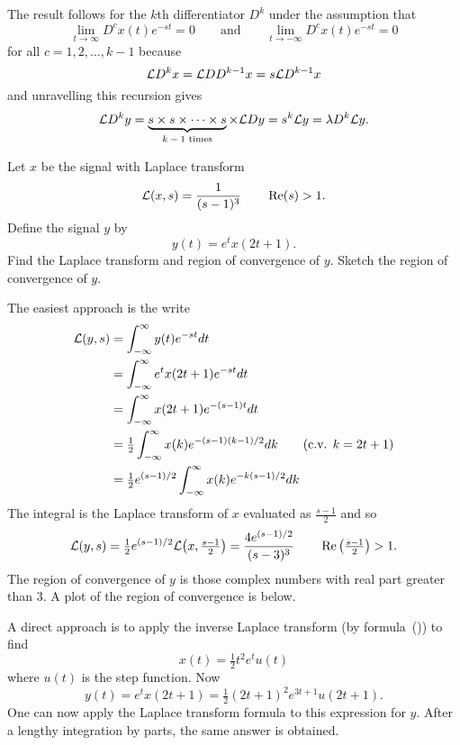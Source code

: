 \begin{excersizelist}
\begin{solution}
The result follows for the $k$th differentiator $D^k$ under the assumption that
\[
\lim_{t\to\infty} D^{c}x(t) e^{-st} = 0 \qquad \text{and} \qquad \lim_{t\to-\infty} D^{c}x(t) e^{-st} = 0
\]
for all $c = 1, 2, \dots, k-1$ because
\[
\mathcal L D^k x = \mathcal L D D^{k-1} x= s \mathcal L D^{k-1}x 
\]
and unravelling this recursion gives
\[
\mathcal L D^k y  = \underbrace{s \times s \times \dots \times s}_{\text{$k-1$ times}} \times \mathcal L D y = s^k \mathcal L y  = \lambda D^k \mathcal L y.
\]
\end{solution}

\item Let $x$ be the signal with Laplace transform 
\[
\mathcal L(x,s) = \frac{1}{(s - 1)^3} \qquad \operatorname{Re}(s) > 1.
\]  
Define the signal $y$ by
\[
y(t) = e^{t} x( 2t + 1  ).
\]
Find the Laplace transform and region of convergence of $y$.  Sketch the region of convergence of $y$.
\begin{solution}
The easiest approach is the write
\begin{align*}
\mathcal L(y,s) &= \int_{-\infty}^\infty y(t) e^{-st} dt \\
&= \int_{-\infty}^\infty e^{t} x( 2t + 1  ) e^{-st} dt \\
&= \int_{-\infty}^\infty x( 2t + 1  ) e^{-(s-1)t} dt \\
&= \tfrac{1}{2} \int_{-\infty}^\infty x( k ) e^{-(s-1)(k-1)/2} dk \qquad \text{(c.v. $k = 2t + 1$)} \\ 
&= \tfrac{1}{2} e^{(s-1)/2}\int_{-\infty}^\infty x( k ) e^{-k(s-1)/2} dk
\end{align*}
The integral is the Laplace transform of $x$ evaluated as $\tfrac{s-1}{2}$ and so
\[
\mathcal L(y,s) = \tfrac{1}{2} e^{(s-1)/2} \mathcal L\big(x, \tfrac{s-1}{2}\big)  = \frac{4 e^{(s-1)/2} }{(s-3)^3} \qquad \operatorname{Re}\big(\tfrac{s-1}{2}\big) > 1.
\]
The region of convergence of $y$ is those complex numbers with real part greater than $3$.  A plot of the region of convergence is below.

\begin{center}
\end{center}

A direct approach is to apply the inverse Laplace transform (by formula~()) to find
\[
x(t) = \tfrac{1}{2} t^2 e^{t} u(t)
\]
where $u(t)$ is the step function.  Now
\[
y(t) = e^{t} x( 2t + 1  ) = \tfrac{1}{2} (2t + 1)^2 e^{3t + 1} u(2t + 1).
\]
One can now apply the Laplace transform formula to this expression for $y$.  After a lengthy integration by parts, the same answer is obtained.
\end{solution}



\end{excersizelist}
